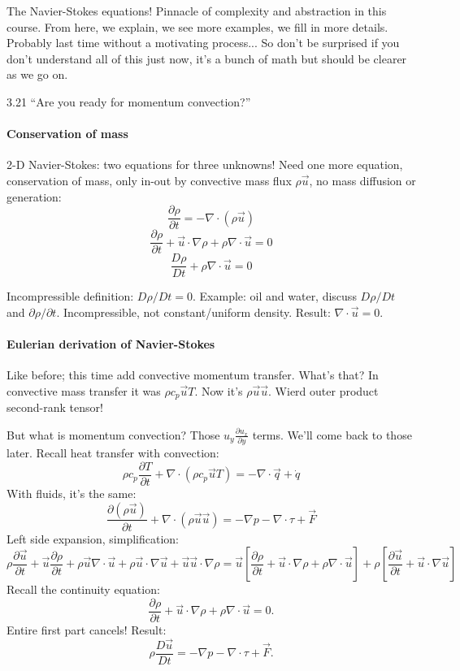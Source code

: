 \documentclass{report}
\begin{document}
The Navier-Stokes equations!  Pinnacle of complexity and abstraction in this
course.  From here, we explain, we see more examples, we fill in more details.
Probably last time without a motivating process...  So don't be surprised if
you don't understand all of this just now, it's a bunch of math but should be
clearer as we go on.

3.21 ``Are you ready for momentum convection?''

\paragraph{Conservation of mass}

2-D Navier-Stokes: two equations for three unknowns!  Need one more equation,
conservation of mass, only in-out by convective mass flux $\rho\vec{u}$, no
mass diffusion or generation:
$$\frac{\partial\rho}{\partial t} = -\nabla\cdot(\rho\vec{u})$$
$$\frac{\partial\rho}{\partial t} + \vec{u}\cdot\nabla\rho +
\rho\nabla\cdot\vec{u} = 0$$
$$\frac{D\rho}{Dt} + \rho\nabla\cdot\vec{u} = 0$$

Incompressible definition: $D\rho/Dt=0$.  Example: oil and water, discuss
$D\rho/Dt$ and $\partial\rho/\partial t$.  Incompressible, not constant/uniform
density.  Result: $\nabla\cdot\vec{u}=0$.

\paragraph{Eulerian derivation of Navier-Stokes}

Like before; this time add convective momentum transfer.  What's that?  In
convective mass transfer it was $\rho c_p \vec{u}T$.  Now it's
$\rho\vec{u}\vec{u}$.  Wierd outer product second-rank tensor!

But what is momentum convection?  Those $u_y\frac{\partial u_x}{\partial y}$
terms.  We'll come back to those later.  Recall heat transfer with convection:
$$\rho c_p\frac{\partial T}{\partial t} + \nabla\cdot(\rho c_p\vec{u}T) =
-\nabla\cdot\vec{q} + \dot{q}$$
With fluids, it's the same:
$$\frac{\partial(\rho\vec{u})}{\partial t} + \nabla\cdot(\rho\vec{u}\vec{u}) =
-\nabla p - \nabla\cdot\tau + \vec{F}$$
Left side expansion, simplification:
$$\rho\frac{\partial\vec{u}}{\partial t} +
\vec{u}\frac{\partial\rho}{\partial t} +
\rho\vec{u}\nabla\cdot\vec{u} + \rho\vec{u}\cdot\nabla\vec{u} +
\vec{u}\vec{u}\cdot\nabla\rho =
\vec{u}\left[\frac{\partial\rho}{\partial t} + \vec{u}\cdot\nabla\rho +
  \rho\nabla\cdot\vec{u}\right] + \rho\left[\frac{\partial\vec{u}}{\partial t}
  + \vec{u}\cdot\nabla\vec{u}\right]$$
Recall the continuity equation:
$$\frac{\partial\rho}{\partial t} + \vec{u}\cdot\nabla\rho +
\rho\nabla\cdot\vec{u} = 0.$$
Entire first part cancels!  Result:
$$\rho\frac{D\vec{u}}{Dt} = -\nabla p - \nabla\cdot\tau + \vec{F}.$$
\end{document}
